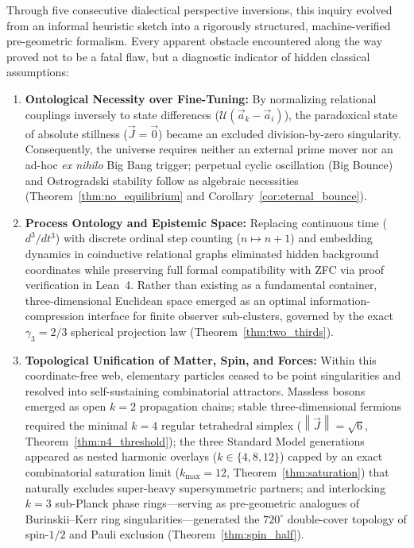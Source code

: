 \documentclass[11pt,a4paper]{article}
\theoremstyle{plain}
\theoremstyle{definition}
\theoremstyle{remark}
\newcommand{\Jerk}{\vec{J}}
\newcommand{\Acc}{\vec{a}}
\newcommand{\norm}[1]{\left\lVert #1 \right\rVert}
\begin{document}
Through five consecutive dialectical perspective inversions, this inquiry evolved from an informal heuristic sketch into a rigorously structured, machine-verified pre-geometric formalism. Every apparent obstacle encountered along the way proved not to be a fatal flaw, but a diagnostic indicator of hidden classical assumptions:
\begin{enumerate}
    \item \textbf{Ontological Necessity over Fine-Tuning:} By normalizing relational couplings inversely to state differences ($\mathcal{U}(\Acc_k - \Acc_i)$), the paradoxical state of absolute stillness ($\Jerk = \vec{0}$) became an excluded division-by-zero singularity. Consequently, the universe requires neither an external prime mover nor an ad-hoc \emph{ex nihilo} Big Bang trigger; perpetual cyclic oscillation (Big Bounce) and Ostrogradski stability follow as algebraic necessities (Theorem~\ref{thm:no_equilibrium} and Corollary~\ref{cor:eternal_bounce}).
    \item \textbf{Process Ontology and Epistemic Space:} Replacing continuous time ($d^3/dt^3$) with discrete ordinal step counting ($n \mapsto n+1$) and embedding dynamics in coinductive relational graphs eliminated hidden background coordinates while preserving full formal compatibility with ZFC via proof verification in Lean~4. Rather than existing as a fundamental container, three-dimensional Euclidean space emerged as an optimal information-compression interface for finite observer sub-clusters, governed by the exact $\gamma_3 = 2/3$ spherical projection law (Theorem~\ref{thm:two_thirds}).
    \item \textbf{Topological Unification of Matter, Spin, and Forces:} Within this coordinate-free web, elementary particles ceased to be point singularities and resolved into self-sustaining combinatorial attractors. Massless bosons emerged as open $k=2$ propagation chains; stable three-dimensional fermions required the minimal $k=4$ regular tetrahedral simplex ($\norm{\Jerk} = \sqrt{6}$, Theorem~\ref{thm:n4_threshold}); the three Standard Model generations appeared as nested harmonic overlays ($k \in \{4, 8, 12\}$) capped by an exact combinatorial saturation limit ($k_{\max} = 12$, Theorem~\ref{thm:saturation}) that naturally excludes super-heavy supersymmetric partners; and interlocking $k=3$ sub-Planck phase rings—serving as pre-geometric analogues of Burinskii--Kerr ring singularities—generated the $720^\circ$ double-cover topology of spin-$1/2$ and Pauli exclusion (Theorem~\ref{thm:spin_half}).

\end{enumerate}
\end{document}
